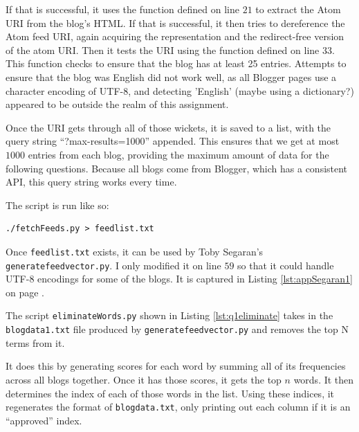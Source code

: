 \documentclass[letterpaper,11pt]{article}
\begin{document}
If that is successful, it uses the function defined on line $21$ to extract the Atom URI from the blog's HTML.  If that is successful, it then tries to dereference the Atom feed URI, again acquiring the representation and the redirect-free version of the atom URI.  Then it tests the URI using the function defined on line $33$.  This function checks to ensure that the blog has at least 25 entries.  Attempts to ensure that the blog was English did not work well, as all Blogger pages use a character encoding of UTF-8, and detecting 'English' (maybe using a dictionary?) appeared to be outside the realm of this assignment.

Once the URI gets through all of those wickets, it is saved to a list, with the query string ``?max-results=1000'' appended.  This ensures that we get at most $1000$ entries from each blog, providing the maximum amount of data for the following questions.  Because all blogs come from Blogger, which has a consistent API, this query string works every time.



The script is run like so:
\begin{lstlisting}[frame=single]
./fetchFeeds.py > feedlist.txt
\end{lstlisting}

Once \verb+feedlist.txt+ exists, it can be used by Toby Segaran's \verb+generatefeedvector.py+\cite{pci}.  I only modified it on line $59$ so that it could handle UTF-8 encodings for some of the blogs.  It is captured in Listing \ref{lst:appSegaran1} on page \pageref{lst:appSegaran1}.

The script \verb+eliminateWords.py+  shown in Listing \ref{lst:q1eliminate} takes in the \verb+blogdata1.txt+ file produced by \verb+generatefeedvector.py+ and removes the top N terms from it.

It does this by generating scores for each word by summing all of its frequencies across all blogs together.  Once it has those scores, it gets the top $n$ words.  It then determines the index of each of those words in the list.  Using these indices, it regenerates the format of \verb+blogdata.txt+, only printing out each column if it is an ``approved'' index.


\end{document}
